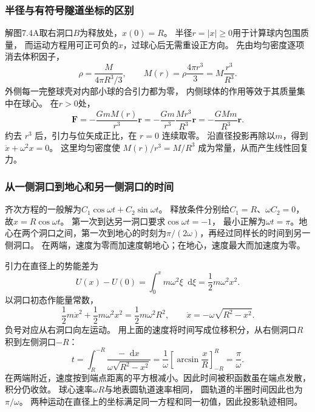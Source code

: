 \documentclass[UTF8,fontset=fandol,a4paper,11pt]{ctexart}
\newcommand{\dd}{\mathop{}\!\mathrm{d}}
\begin{document}
\subsubsection*{半径与有符号隧道坐标的区别}
解图7.4A取右洞口$B$为释放处，$x(0)=R$。
半径$r=|x|\geq0$用于计算球内包围质量，
而运动方程用可正可负的$x$，过球心后无需重设正方向。
先由均匀密度逐项消去体积因子，
\[
\rho=\frac{M}{4\pi R^3/3},\qquad
M(r)=\rho\frac{4\pi r^3}{3}=M\frac{r^3}{R^3}.
\]
外侧每一完整球壳对内部小球的合引力都为零，
内侧球体的作用等效于其质量集中在球心。
在$r>0$处，
\[
\boldsymbol F=-\frac{GmM(r)}{r^3}\boldsymbol r
=-\frac{Gm}{r^3}\frac{Mr^3}{R^3}\boldsymbol r
=-\frac{GMm}{R^3}\boldsymbol r.
\]
约去 $r^3$ 后，引力与位矢成正比，在 $r=0$ 连续取零。
沿直径投影再除以$m$，得到$\ddot x+\omega^2x=0$。
这里均匀密度使 $M(r)/r^3=M/R^3$ 成为常量，从而产生线性回复力。

\subsubsection*{从一侧洞口到地心和另一侧洞口的时间}
齐次方程的一般解为$C_1\cos\omega t+C_2\sin\omega t$。
释放条件分别给$C_1=R$、$\omega C_2=0$，故$x=R\cos\omega t$。
第一次到达另一洞口要求$\cos\omega t=-1$，
最小正解为$\omega t=\pi$。地心在两个洞口之间，第一次到地心的时刻为$\pi/(2\omega)$，再经过同样长的时间到另一侧洞口。
在两端，速度为零而加速度朝地心；在地心，速度最大而加速度为零。

引力在直径上的势能差为
\[
U(x)-U(0)=\int_0^x m\omega^2\xi\dd\xi
=\frac12m\omega^2x^2.
\]
以洞口初态作能量常数，
\[
\frac12m\dot x^2+\frac12m\omega^2x^2
=\frac12m\omega^2R^2,
\qquad \dot x=-\omega\sqrt{R^2-x^2}.
\]
负号对应从右洞口向左运动。
用上面的速度将时间写成位移积分，从右侧洞口$R$积到左侧洞口$-R$：
\[
t=\int_R^{-R}\frac{-\dd x}{\omega\sqrt{R^2-x^2}}
=\frac1\omega\left[\arcsin\frac xR\right]_{-R}^{R}
=\frac\pi\omega.
\]
在两端附近，速度按到端点距离的平方根减小。因此时间被积函数虽在端点发散，积分仍收敛。
球心速率$\omega R$与地表圆轨道速率相同，
圆轨道的半圈时间因此也为$\pi/\omega$。
两种运动在直径上的坐标满足同一方程和同一初值，因此投影轨迹相同。
\end{document}
